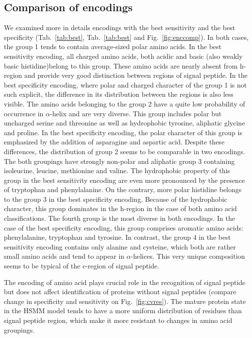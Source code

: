 \documentclass[fleqn,10pt,twoside]{gcb15submission}
\begin{document}
\subsection*{Comparison of encodings}

We examined more in details encodings with the best sensitivity and the best specificity (Tab.~\ref{tab:best}, Tab.~\ref{tab:best} and Fig.~\ref{fig:enccomp}). In both cases, the group 1 tends to contain average-sized polar amino acids. In the best sensitivity encoding, all charged amino acids, both acidic and basic (also weakly basic histidine)belong to this group. These amino acids are nearly absent from h-region and provide very good distinction between regions of signal peptide. In the best specificity encoding, where polar and charged character of the group 1 is not such explicit, the difference in its distribution between the regions is also less visible.
The amino acids belonging to the group 2 have a quite low probability of occurrence in $\alpha$-helix and are very diverse. This group includes polar but uncharged serine and threonine as well as hydrophobic tyrosine, aliphatic glycine and proline. In the best specificity encoding, the polar character of this group is emphasized by the addition of asparagine and aspartic acid. Despite these differences, the distribution of group 2 seems to be comparable in two encodings. The both groupings have strongly non-polar and aliphatic group 3 containing isoleucine, leucine, methionine and valine. The hydrophobic property of this group in the best sensitivity encoding are even more pronounced by the presence of tryptophan and phenylalanine. On the contrary, more polar histidine belongs to the group 3 in the best specificity encoding. Because of the hydrophobic character, this group dominates in the h-region in the case of both amino acid classifications.
The fourth group is the most diverse in both encodings. In the case of the best specificity encoding, this group comprises aromatic amino acids: phenylalanine, tryptophan and tyrosine. In contrast, the group 4 in the best sensitivity encoding contains only alanine and cysteine, which both are rather small amino acids and tend to appear in $\alpha$-helices. This very unique composition seems to be typical of the c-region of signal peptide.

The encoding of amino acid plays crucial role in the recognition of signal peptide but does not affect identification of proteins without signal peptides (compare change in specificity and sensitivity on Fig.~\ref{fig:cvres}). The mature protein state in the HSMM model tends to have a more uniform distribution of residues than signal peptide region, which make it more resistant to changes in amino acid groupings.
\end{document}
